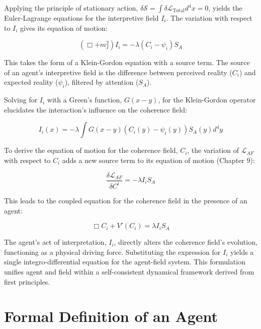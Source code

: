 Applying the principle of stationary action, \(\delta \mathcal{S} = \int \delta \mathcal{L}_{\text{Total}} d^4x = 0\), yields the Euler-Lagrange equations for the interpretive field \(I_i\). The variation with respect to \(I_i\) gives its equation of motion:

\begin{equation}
(\Box + m_I^2) I_i = -\lambda (C_i - \psi_i) S_A
\end{equation}

This takes the form of a Klein-Gordon equation with a source term. The source of an agent's interpretive field is the difference between perceived reality (\(C_i\)) and expected reality (\(\psi_i\)), filtered by attention (\(S_A\)).

Solving for \(I_i\) with a Green's function, \(G(x-y)\), for the Klein-Gordon operator elucidates the interaction's influence on the coherence field:

\begin{equation}
I_i(x) = -\lambda \int G(x-y) \left( C_i(y) - \psi_i(y) \right) S_A(y) d^4y
\end{equation}

To derive the equation of motion for the coherence field, \(C_i\), the variation of \(\mathcal{L}_{AF}\) with respect to \(C_i\) adds a new source term to its equation of motion (Chapter 9):

\begin{equation}
\frac{\delta \mathcal{L}_{AF}}{\delta C^i} = -\lambda I_i S_A
\end{equation}

This leads to the coupled equation for the coherence field in the presence of an agent:

\begin{equation}
\Box C_i + V'(C_i) = \lambda I_i S_A
\end{equation}

The agent's act of interpretation, \(I_i\), directly alters the coherence field's evolution, functioning as a physical driving force. Substituting the expression for \(I_i\) yields a single integro-differential equation for the agent-field system. This formulation unifies agent and field within a self-consistent dynamical framework derived from first principles.

\section{Formal Definition of an Agent}

